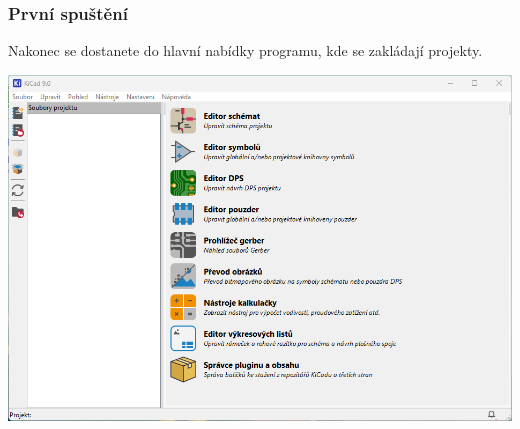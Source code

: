 \documentclass{beamer}
\begin{document}
	\begin{frame}
    \frametitle{První spuštění}
    \small
    Nakonec se dostanete do hlavní nabídky programu, kde se zakládají projekty.
		
    \begin{center}
			\includegraphics[scale=0.5]{obr/kicad_pocatecni_spusteni3.png}
		\end{center}
	\end{frame}
	
\end{document}
